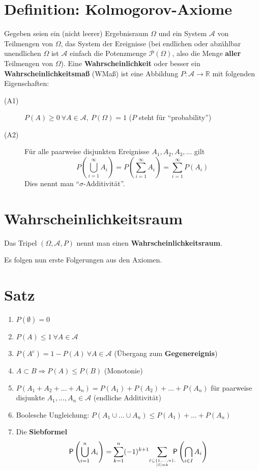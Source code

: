 \section{Definition: Kolmogorov-Axiome}

Gegeben seien ein (nicht leerer) Ergebnisraum $\Omega$ und ein System $\mathcal{A}$ von Teilmengen von $\Omega$, das System der Ereignisse (bei endlichen oder abzählbar unendlichen $\Omega$ ist $\mathcal{A}$ einfach die Potenzmenge $\mathcal{P}(\Omega)$, also die Menge \textbf{aller} Teilmengen von $\Omega$).
Eine \textbf{Wahrscheinlichkeit} oder besser ein \textbf{Wahrscheinlichkeitsmaß} (WMaß) ist eine Abbildung $P:\mathcal{A} \rightarrow \mathbb{R}$ mit folgenden Eigenschaften:
\begin{description}
 \item[(A1)] $P(A)\geq 0\ \forall A \in \mathcal{A},\ P(\Omega)=1$ ($P$ steht für ``probability'')
 \item[(A2)] Für alle paarweise disjunkten Ereignisse $A_1,A_2,A_3,\ldots$ gilt
 \begin{displaymath}
    P(\bigcup_{i=1}^\infty A_i) = P(\sum_{i=1}^\infty A_i) = \sum_{i=1}^\infty P(A_i)
 \end{displaymath}
 Dies nennt man ``$\sigma$-Additivität''.
\end{description}

\section{Wahrscheinlichkeitsraum}
Das Tripel $(\Omega,\mathcal{A},P)$ nennt man einen \textbf{Wahrscheinlichkeitsraum}.

\noindent Es folgen nun erste Folgerungen aus den Axiomen.

\section{Satz}
\renewcommand{\labelitemi}{\alph}
\begin{enumerate}
    \item $P(\emptyset) = 0$
    \item $P(A) \leq 1 \ \forall A \in \mathcal{A}$
    \item $P(A^c) = 1 - P(A) \ \forall A \in \mathcal{A}$ (Übergang zum \textbf{Gegenereignis})
    \item $A \subset B \Rightarrow P(A) \leq P(B)$ (Monotonie)
    \item $P(A_1 + A_2 + \ldots + A_n) = P(A_1) + P(A_2) + \ldots + P(A_n)$ für paarweise disjunkte $A_1,\ldots,A_n \in \mathcal{A}$ (endliche Additivität)
    \item Boolesche Ungleichung: $P(A_1 \cup \ldots \cup A_n) \leq P(A_1) + \ldots + P(A_n)$
    \item Die \textbf{Siebformel}
    \[
        \mathsf{P}\left(\bigcup_{i=1}^nA_i\right) = \sum_{k=1}^n(-1)^{k+1}\!\!\sum_{I\subseteq\{1,\dots,n\},\atop |I|=k}\!\!\!\!\mathsf{P}\left(\bigcap_{i\in I}A_i\right)
    \]
\end{enumerate}

